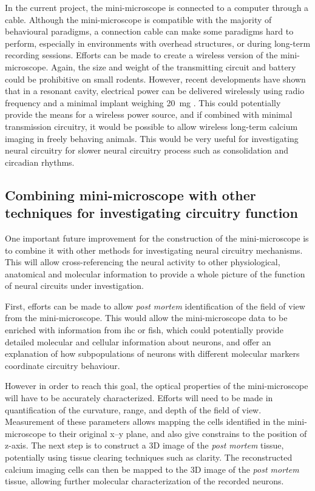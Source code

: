 In the current project, the mini-microscope is connected to a computer through a cable. Although the mini-microscope is compatible with the majority of behavioural paradigms, a connection cable can make some paradigms hard to perform, especially in environments with overhead structures, or during long-term recording sessions. Efforts can be made to create a wireless version of the mini-microscope. Again, the size and weight of the transmitting circuit and battery could be prohibitive on small rodents. However, recent developments have shown that in a resonant cavity, electrical power can be delivered wirelessly using radio frequency and a minimal implant weighing \SI{20}{\mg} \citep{montgomery15}. This could potentially provide the means for a wireless power source, and if combined with minimal transmission circuitry, it would be possible to allow wireless long-term calcium imaging in freely behaving animals. This would be very useful for investigating neural circuitry for slower neural circuitry process such as consolidation and circadian rhythms. 

\subsection{Combining mini-microscope with other techniques for investigating circuitry function}

One important future improvement for the construction of the mini-microscope is to combine it with other methods for investigating neural circuitry mechanisms. This will allow cross-referencing the neural activity to other physiological, anatomical and molecular information to provide a whole picture of the function of neural circuits under investigation. 

First, efforts can be made to allow \textit{post mortem} identification of the field of view from the mini-microscope. This would allow the mini-microscope data to be enriched with information from \gls{ihc} or \gls{fish}, which could potentially provide detailed molecular and cellular information about neurons, and offer an explanation of how subpopulations of neurons with different molecular markers coordinate circuitry behaviour. 

However in order to reach this goal, the optical properties of the mini-microscope will have to be accurately characterized. Efforts will need to be made in quantification of the curvature, range, and depth of the field of view. Measurement of these parameters allows mapping the cells identified in the mini-microscope to their original x--y plane, and also give constrains to the position of z-axis. The next step is to construct a 3D image of the \textit{post mortem} tissue, potentially using tissue clearing techniques such as \gls{clarity}. The reconstructed calcium imaging cells can then be mapped to the 3D image of the \textit{post mortem} tissue, allowing further molecular characterization of the recorded neurons. 

